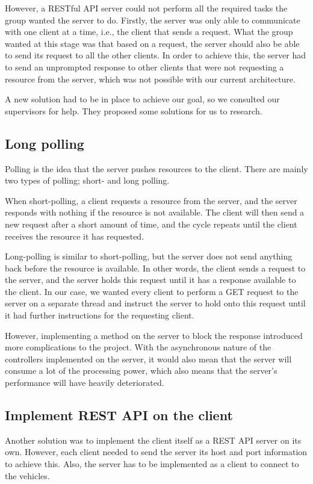 However, a RESTful API server could not perform all the required tasks the group wanted the server to do. Firstly, the server was only able to communicate with one client at a time, i.e., the client that sends a request. What the group wanted at this stage was that based on a request, the server should also be able to send its request to all the other clients. In order to achieve this, the server had to send an unprompted response to other clients that were not requesting a resource from the server, which was not possible with our current architecture.

A new solution had to be in place to achieve our goal, so we consulted our supervisors for help. They proposed some solutions for us to research. 

\subsection{Long polling}
Polling is the idea that the server pushes resources to the client. There are mainly two types of polling; short- and long polling. 

When short-polling, a client requests a resource from the server, and the server responds with nothing if the resource is not available. The client will then send a new request after a short amount of time, and the cycle repeats until the client receives the resource it has requested.

Long-polling is similar to short-polling, but the server does not send anything back before the resource is available. In other words, the client sends a request to the server, and the server holds this request until it has a response available to the client. In our case, we wanted every client to perform a GET request to the server on a separate thread and instruct the server to hold onto this request until it had further instructions for the requesting client.

However, implementing a method on the server to block the response introduced more complications to the project. With the asynchronous nature of the controllers implemented on the server, it would also mean that the server will consume a lot of the processing power, which also means that the server's performance will have heavily deteriorated.

\subsection{Implement REST API on the client}
Another solution was to implement the client itself as a REST API server on its own. However, each client needed to send the server its host and port information to achieve this. Also, the server has to be implemented as a client to connect to the vehicles.

